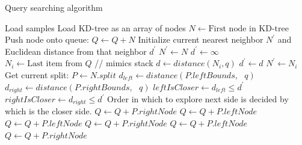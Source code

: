 \documentclass[11pt]{amsart}
\begin{document}
\begin{algorithm}
\caption{Query searching algorithm}
\label{query_searching}
\begin{algorithmic}[1]
\State Load samples
\State Load KD-tree as an array of nodes
\State
{}
\State $N \gets \text{First node in KD-tree}$
\State Push node onto queue: $Q \gets Q + N$
\State
\State Initialize current nearest neighbor $N^\prime$ and Euclidean distance from that neighbor $d^\prime$
\State $N^\prime \gets N$
\State $d^\prime \gets \infty$
\State
{}
\State $N_i \gets \text{Last item from } Q$ \hspace{0.5in}// mimics stack
\State $d \gets distance(N_i, q)$
\State $d^\prime \gets d$
\State $N^\prime \gets N_i$
\EndIf
\Else
\State Get current split: $P \gets N.split$
\State $d_{left} \gets distance(P.leftBounds,\text{ } q)$ 
\State $d_{right} \gets distance(P.rightBounds,\text{ } q)$ 
\State
\State $leftIsCloser \gets d_{left} \leq d^\prime$ 
\State $rightIsCloser \gets d_{right}  \leq d^\prime$ 
\State
{} 
\State Order in which to explore next side is decided by which is the closer side.
\State $Q \gets Q + P.rightNode$
\State $Q \gets Q + P.leftNode$
\Else
\State $Q \gets Q + P.leftNode$
\State $Q \gets Q + P.rightNode$
\EndIf
{} 
\State $Q \gets Q + P.leftNode$
\State $Q \gets Q + P.rightNode$
\EndIf
\EndIf
\EndWhile
\EndProcedure
\end{algorithmic}
\end{algorithm}

 
 
\end{document}
